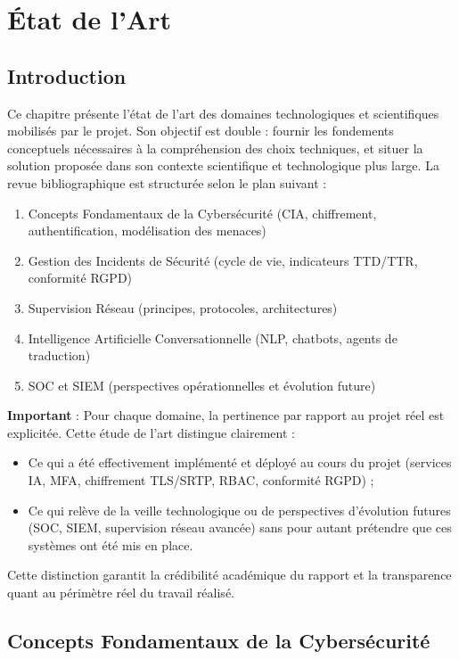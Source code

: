 \chapter{État de l'Art}

\section*{Introduction}
Ce chapitre présente l'état de l'art des domaines technologiques et scientifiques mobilisés par le projet. Son objectif est double : fournir les fondements conceptuels nécessaires à la compréhension des choix techniques, et situer la solution proposée dans son contexte scientifique et technologique plus large. La revue bibliographique est structurée selon le plan suivant :

\begin{enumerate}
    \item Concepts Fondamentaux de la Cybersécurité (CIA, chiffrement, authentification, modélisation des menaces)
    \item Gestion des Incidents de Sécurité (cycle de vie, indicateurs TTD/TTR, conformité RGPD)
    \item Supervision Réseau (principes, protocoles, architectures)
    \item Intelligence Artificielle Conversationnelle (NLP, chatbots, agents de traduction)
    \item SOC et SIEM (perspectives opérationnelles et évolution future)
\end{enumerate}

\textbf{Important} : Pour chaque domaine, la pertinence par rapport au projet réel est explicitée. Cette étude de l'art distingue clairement :
\begin{itemize}
    \item Ce qui a été effectivement implémenté et déployé au cours du projet (services IA, MFA, chiffrement TLS/SRTP, RBAC, conformité RGPD) ;
    \item Ce qui relève de la veille technologique ou de perspectives d'évolution futures (SOC, SIEM, supervision réseau avancée) sans pour autant prétendre que ces systèmes ont été mis en place.
\end{itemize}

Cette distinction garantit la crédibilité académique du rapport et la transparence quant au périmètre réel du travail réalisé.

\section{Concepts Fondamentaux de la Cybersécurité}

